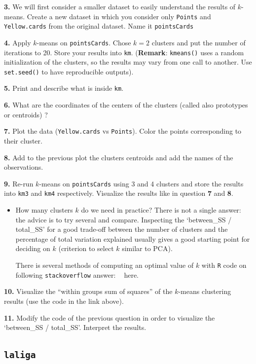 \documentclass[]{book}
\newenvironment{rmdblock}[1]
  {\begin{shaded*}
  \begin{itemize}
  \renewcommand{\labelitemi}{
    \raisebox{-.7\height}[0pt][0pt]{
      {\setkeys{Gin}{width=2em,keepaspectratio}\texttt{[image: img/icons/\#1]}}
    }
  }
  \item
  }
  {
  \end{itemize}
  \end{shaded*}
  }
\newenvironment{rmdcaution}
  {\begin{rmdblock}{caution}}
  {\end{rmdblock}}
\begin{document}
\textbf{3.} We will first consider a smaller dataset to easily
understand the results of \(k\)-means. Create a new dataset in which you
consider only \texttt{Points} and \texttt{Yellow.cards} from the
original dataset. Name it \texttt{pointsCards}

\textbf{4.} Apply \(k\)-means on \texttt{pointsCards}. Chose \(k=2\)
clusters and put the number of iterations to 20. Store your results into
\texttt{km}. (\textbf{Remark}: \texttt{kmeans()} uses a random
initialization of the clusters, so the results may vary from one call to
another. Use \texttt{set.seed()} to have reproducible outputs).

\textbf{5.} Print and describe what is inside \texttt{km}.

\textbf{6.} What are the coordinates of the centers of the clusters
(called also prototypes or centroids) ?

\textbf{7.} Plot the data (\texttt{Yellow.cards} vs \texttt{Points}).
Color the points corresponding to their cluster.

\textbf{8.} Add to the previous plot the clusters centroids and add the
names of the observations.

\textbf{9.} Re-run \(k\)-means on \texttt{pointsCards} using 3 and 4
clusters and store the results into \texttt{km3} and \texttt{km4}
respectively. Visualize the results like in question \textbf{7} and
\textbf{8}.

\begin{rmdcaution}
How many clusters \(k\) do we need in practice? There is not a single
answer: the advice is to try several and compare. Inspecting the
`between\_SS / total\_SS' for a good trade-off between the number of
clusters and the percentage of total variation explained usually gives a
good starting point for deciding on \(k\) (criterion to select \(k\)
similar to PCA).

There is several methods of computing an optimal value of \(k\) with
\texttt{R} code on following \texttt{stackoverflow} answer:
\textcolor{white}{[}\faStackOverflow\textcolor{white}{]} here.
\end{rmdcaution}

\textbf{10.} Visualize the ``within groups sum of squares'' of the
\(k\)-means clustering results (use the code in the link above).

\textbf{11.} Modify the code of the previous question in order to
visualize the `between\_SS / total\_SS'. Interpret the results.

\subsection*{\texorpdfstring{\texttt{laliga}}{laliga}}\label{laliga}
\end{document}
